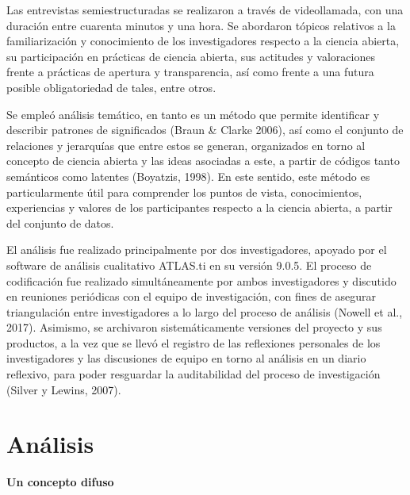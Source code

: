 \documentclass[
  letterpaper,
  DIV=11,
  numbers=noendperiod]{scrreprt}
\begin{document}
Las entrevistas semiestructuradas se realizaron a través de
videollamada, con una duración entre cuarenta minutos y una hora. Se
abordaron tópicos relativos a la familiarización y conocimiento de los
investigadores respecto a la ciencia abierta, su participación en
prácticas de ciencia abierta, sus actitudes y valoraciones frente a
prácticas de apertura y transparencia, así como frente a una futura
posible obligatoriedad de tales, entre otros.

Se empleó análisis temático, en tanto es un método que permite
identificar y describir patrones de significados (Braun \& Clarke 2006),
así como el conjunto de relaciones y jerarquías que entre estos se
generan, organizados en torno al concepto de ciencia abierta y las ideas
asociadas a este, a partir de códigos tanto semánticos como latentes
(Boyatzis, 1998). En este sentido, este método es particularmente útil
para comprender los puntos de vista, conocimientos, experiencias y
valores de los participantes respecto a la ciencia abierta, a partir del
conjunto de datos.

El análisis fue realizado principalmente por dos investigadores, apoyado
por el software de análisis cualitativo ATLAS.ti en su versión 9.0.5. El
proceso de codificación fue realizado simultáneamente por ambos
investigadores y discutido en reuniones periódicas con el equipo de
investigación, con fines de asegurar triangulación entre investigadores
a lo largo del proceso de análisis (Nowell et al., 2017). Asimismo, se
archivaron sistemáticamente versiones del proyecto y sus productos, a la
vez que se llevó el registro de las reflexiones personales de los
investigadores y las discusiones de equipo en torno al análisis en un
diario reflexivo, para poder resguardar la auditabilidad del proceso de
investigación (Silver y Lewins, 2007).


\hypertarget{anuxe1lisis}{%
\chapter{Análisis}\label{anuxe1lisis}}

\textbf{Un concepto difuso}
\end{document}
